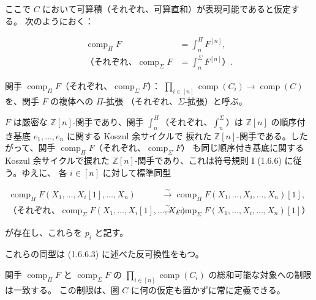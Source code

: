 \clearpage
{}%
ここで $C$ において可算積（それぞれ、可算直和）が表現可能であると仮定する。
次のようにおく：

\begin{equation}
  \begin{aligned}
    \operatorname{comp}_{\Pi}F
      &=\int_n^{\Pi}F^{[n]},\\
    \text{（それぞれ、}\operatorname{comp}_{\Sigma}F
      &=\int_n^{\Sigma}F^{[n]}\text{）}.
  \end{aligned}
  \tag{2.4.2.6}
\end{equation}

関手
$\operatorname{comp}_{\Pi}F$（それぞれ、$\operatorname{comp}_{\Sigma}F$）：
$\prod_{i\in[n]}\operatorname{comp}(C_i)\longrightarrow
\operatorname{comp}(C)$ を、関手 $F$ の複体への $\Pi$-拡張
（それぞれ、$\Sigma$-拡張）と呼ぶ。

$F$ は厳密な $\mathbb Z[n]$-関手であり、関手
$\int_n^{\Pi}$（それぞれ、$\int_n^{\Sigma}$）は
$\mathbb Z[n]$ の順序付き基底 $e_1,\ldots,e_n$ に関する Koszul 余サイクルで
捩れた $\mathbb Z[n]$-関手である。したがって、関手
$\operatorname{comp}_{\Pi}F$（それぞれ、$\operatorname{comp}_{\Sigma}F$）
も同じ順序付き基底に関する Koszul 余サイクルで捩れた
$\mathbb Z[n]$-関手であり、これは符号規則 I (1.6.6) に従う。ゆえに、
各 $i\in[n]$ に対して標準同型

\begin{equation}
  \begin{aligned}
    \operatorname{comp}_{\Pi}F(X_1,\ldots,X_i[1],\ldots,X_n)
      &\xrightarrow{\sim}
      \operatorname{comp}_{\Pi}F(X_1,\ldots,X_i,\ldots,X_n)[1],\\
    \text{（それぞれ、}\operatorname{comp}_{\Sigma}F(X_1,\ldots,X_i[1],\ldots,X_n)
      &\xrightarrow{\sim}
      \operatorname{comp}_{\Sigma}F(X_1,\ldots,X_i,\ldots,X_n)[1]\text{）}
  \end{aligned}
  \tag{2.4.2.7}
\end{equation}

が存在し、これらを $p_i$ と記す。

これらの同型は (1.6.6.3) に述べた反可換性をもつ。

関手 $\operatorname{comp}_{\Pi}F$ と $\operatorname{comp}_{\Sigma}F$ の
$\prod_{i\in[n]}\operatorname{comp}(C_i)$ の総和可能な対象への制限は一致する。
この制限は、圏 $C$ に何の仮定も置かずに常に定義できる。

